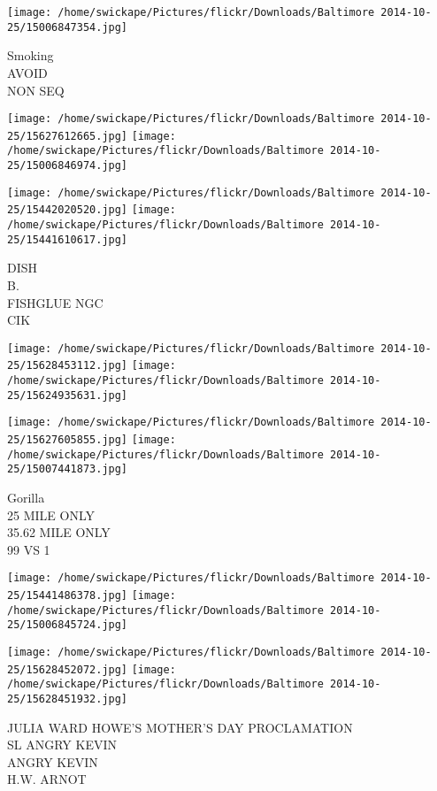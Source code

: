 \documentclass[10pt,letterpaper]{article}
\begin{document}
\vspace{0.25in}
\texttt{[image: /home/swickape/Pictures/flickr/Downloads/Baltimore 2014-10-25/15006847354.jpg]}

Smoking\\
AVOID\\
NON SEQ\\
\pagebreak

\texttt{[image: /home/swickape/Pictures/flickr/Downloads/Baltimore 2014-10-25/15627612665.jpg]}
\texttt{[image: /home/swickape/Pictures/flickr/Downloads/Baltimore 2014-10-25/15006846974.jpg]}

\texttt{[image: /home/swickape/Pictures/flickr/Downloads/Baltimore 2014-10-25/15442020520.jpg]}
\texttt{[image: /home/swickape/Pictures/flickr/Downloads/Baltimore 2014-10-25/15441610617.jpg]}

DISH\\
B.\\
FISHGLUE NGC\\
CIK\\
\pagebreak

\texttt{[image: /home/swickape/Pictures/flickr/Downloads/Baltimore 2014-10-25/15628453112.jpg]}
\texttt{[image: /home/swickape/Pictures/flickr/Downloads/Baltimore 2014-10-25/15624935631.jpg]}

\texttt{[image: /home/swickape/Pictures/flickr/Downloads/Baltimore 2014-10-25/15627605855.jpg]}
\texttt{[image: /home/swickape/Pictures/flickr/Downloads/Baltimore 2014-10-25/15007441873.jpg]}

Gorilla\\
25 MILE ONLY\\
35.62 MILE ONLY\\
99 VS 1\\
\pagebreak

\texttt{[image: /home/swickape/Pictures/flickr/Downloads/Baltimore 2014-10-25/15441486378.jpg]}
\texttt{[image: /home/swickape/Pictures/flickr/Downloads/Baltimore 2014-10-25/15006845724.jpg]}

\texttt{[image: /home/swickape/Pictures/flickr/Downloads/Baltimore 2014-10-25/15628452072.jpg]}
\texttt{[image: /home/swickape/Pictures/flickr/Downloads/Baltimore 2014-10-25/15628451932.jpg]}

JULIA WARD HOWE'S MOTHER'S DAY PROCLAMATION\\
SL ANGRY KEVIN\\
ANGRY KEVIN\\
H.W. ARNOT\\
\pagebreak
\end{document}
